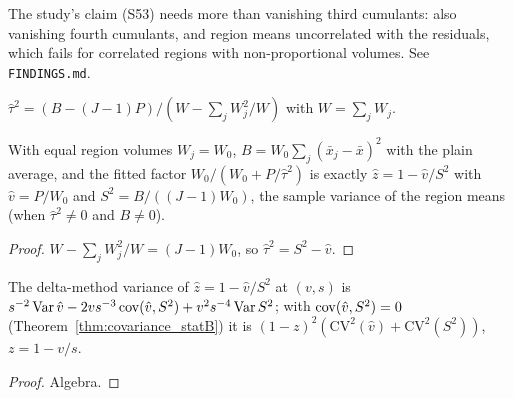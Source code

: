 \begin{remark}\label{rem:covB}
  The study's claim (S53) needs more than vanishing third cumulants: also vanishing fourth
  cumulants, and region means uncorrelated with the residuals, which fails for correlated regions
  with non-proportional volumes. See \texttt{FINDINGS.md}.
\end{remark}

\begin{definition}\label{def:bsTau2Hat}
  \leanok
  $\hat\tau^2 = (B - (J - 1)P)/(W - \sum_j W_j^2/W)$ with $W = \sum_j W_j$.
\end{definition}

\begin{theorem}\label{thm:bsZ_balanced}
  \leanok
  With equal region volumes $W_j = W_0$, $B = W_0\sum_j(\bar x_j - \bar x)^2$ with the plain average,
  and the fitted factor $W_0/(W_0 + P/\hat\tau^2)$ is exactly $\hat z = 1 - \hat v/S^2$ with
  $\hat v = P/W_0$ and $S^2 = B/((J - 1)W_0)$, the sample variance of the region means
  (when $\hat\tau^2 \ne 0$ and $B \ne 0$).
\end{theorem}
\begin{proof}
  \leanok
  $W - \sum_jW_j^2/W = (J - 1)W_0$, so $\hat\tau^2 = S^2 - \hat v$.
\end{proof}

\begin{lemma}\label{lem:zHatVar}
  \leanok
  The delta-method variance of $\hat z = 1 - \hat v/S^2$ at $(v, s)$ is
  $s^{-2}\operatorname{Var}\hat v - 2vs^{-3}\operatorname{cov}(\hat v, S^2) + v^2s^{-4}\operatorname{Var} S^2$; with
  $\operatorname{cov}(\hat v, S^2) = 0$ (Theorem~\ref{thm:covariance_statB}) it is
  $(1 - z)^2(\mathrm{CV}^2(\hat v) + \mathrm{CV}^2(S^2))$, $z = 1 - v/s$.
\end{lemma}
\begin{proof}
  \leanok
  Algebra.
\end{proof}

